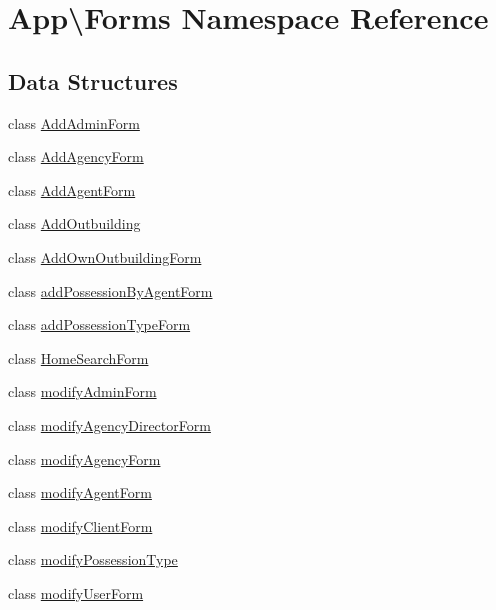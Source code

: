 \hypertarget{namespace_app_1_1_forms}{}\section{App\textbackslash{}Forms Namespace Reference}
\label{namespace_app_1_1_forms}
\subsection*{Data Structures}
\begin{DoxyCompactItemize}
\item 
class \mbox{\hyperlink{class_app_1_1_forms_1_1_add_admin_form}{Add\+Admin\+Form}}
\item 
class \mbox{\hyperlink{class_app_1_1_forms_1_1_add_agency_form}{Add\+Agency\+Form}}
\item 
class \mbox{\hyperlink{class_app_1_1_forms_1_1_add_agent_form}{Add\+Agent\+Form}}
\item 
class \mbox{\hyperlink{class_app_1_1_forms_1_1_add_outbuilding}{Add\+Outbuilding}}
\item 
class \mbox{\hyperlink{class_app_1_1_forms_1_1_add_own_outbuilding_form}{Add\+Own\+Outbuilding\+Form}}
\item 
class \mbox{\hyperlink{class_app_1_1_forms_1_1add_possession_by_agent_form}{add\+Possession\+By\+Agent\+Form}}
\item 
class \mbox{\hyperlink{class_app_1_1_forms_1_1add_possession_type_form}{add\+Possession\+Type\+Form}}
\item 
class \mbox{\hyperlink{class_app_1_1_forms_1_1_home_search_form}{Home\+Search\+Form}}
\item 
class \mbox{\hyperlink{class_app_1_1_forms_1_1modify_admin_form}{modify\+Admin\+Form}}
\item 
class \mbox{\hyperlink{class_app_1_1_forms_1_1modify_agency_director_form}{modify\+Agency\+Director\+Form}}
\item 
class \mbox{\hyperlink{class_app_1_1_forms_1_1modify_agency_form}{modify\+Agency\+Form}}
\item 
class \mbox{\hyperlink{class_app_1_1_forms_1_1modify_agent_form}{modify\+Agent\+Form}}
\item 
class \mbox{\hyperlink{class_app_1_1_forms_1_1modify_client_form}{modify\+Client\+Form}}
\item 
class \mbox{\hyperlink{class_app_1_1_forms_1_1modify_possession_type}{modify\+Possession\+Type}}
\item 
class \mbox{\hyperlink{class_app_1_1_forms_1_1modify_user_form}{modify\+User\+Form}}

\end{DoxyCompactItemize}
